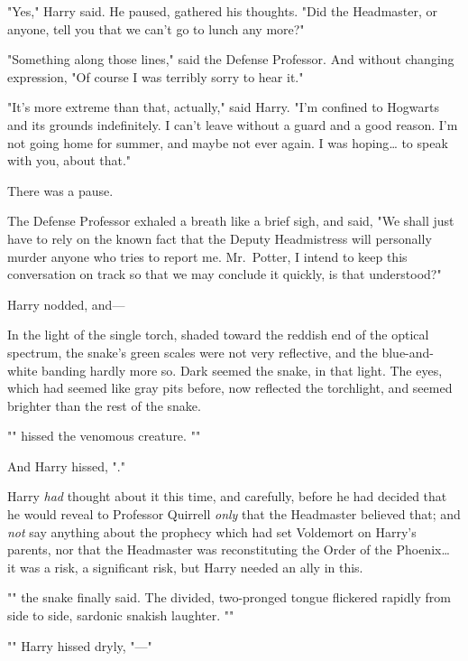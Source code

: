 "Yes," Harry said. He paused, gathered his thoughts. "Did the Headmaster, or 
anyone, tell you that we can't go to lunch any more?"

"Something along those lines," said the Defense Professor. And without changing 
expression, "Of course I was terribly sorry to hear it."

"It's more extreme than that, actually," said Harry. "I'm confined to Hogwarts 
and its grounds indefinitely. I can't leave without a guard and a good reason. 
I'm not going home for summer, and maybe not ever again. I was hoping{\ldots} 
to speak with you, about that."

There was a pause.

The Defense Professor exhaled a breath like a brief sigh, and said, "We shall 
just have to rely on the known fact that the Deputy Headmistress will 
personally murder anyone who tries to report me. Mr.~Potter, I intend to keep 
this conversation on track so that we may conclude it quickly, is that 
understood?"

Harry nodded, and---

In the light of the single torch, shaded toward the reddish end of the optical 
spectrum, the snake's green scales were not very reflective, and the 
blue-and-white banding hardly more so. Dark seemed the snake, in that light. 
The eyes, which had seemed like gray pits before, now reflected the torchlight, 
and seemed brighter than the rest of the snake.

"" hissed the venomous creature. ""

And Harry hissed, "."

Harry \emph{had} thought about it this time, and carefully, before he had 
decided that he would reveal to Professor Quirrell \emph{only} that the 
Headmaster believed that; and \emph{not} say anything about the prophecy which 
had set Voldemort on Harry's parents, nor that the Headmaster was 
reconstituting the Order of the Phoenix{\ldots} it was a risk, a significant 
risk, but Harry needed an ally in this.

"" the snake finally said. The divided, 
two-pronged tongue flickered rapidly from side to side, sardonic snakish 
laughter. ""

"" Harry hissed dryly, "---"

